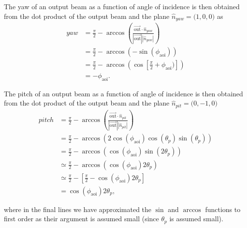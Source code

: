 \documentclass[12pt]{article}
\newcommand{\threeVec}[3]{\big( {#1}, {#2}, {#3} \big)}
\newcommand{\myVec}[1]{\vec{#1}}
\begin{document}
The yaw of an output beam as a function of angle of incidence is then
obtained from the dot product of the output beam and the plane
$\hat{n}_{yaw}=\threeVec{1}{0}{0}$ as
\begin{align}
  yaw &= \frac{\pi}{2} - \arccos\left(\frac{\myVec{\mathrm{out}}\cdot\hat{n}_{yaw}}{|\myVec{\mathrm{out}}||\hat{n}_{yaw}|}\right)\\
  &=\frac{\pi}{2} - \arccos\left( -\sin(\phi_\mathrm{aoi}) \right)\\
  &=\frac{\pi}{2} - \arccos\left( \cos\left[\frac{\pi}{2}+\phi_\mathrm{aoi})\right] \right)\\
&=-\phi_\mathrm{aoi}.
\end{align}

The pitch of an output beam as a function of angle of incidence is
then obtained from the dot product of the output beam and the plane
$\hat{n}_{pit}=\threeVec{0}{-1}{0}$
\begin{align}
  pitch &= \frac{\pi}{2} - \arccos\left(\frac{\myVec{\mathrm{out}}\cdot\hat{n}_{pit}}{|\myVec{\mathrm{out}}||\hat{n}_{pit}|}\right)\\
  &=\frac{\pi}{2} - \arccos\left(2\cos(\phi_\mathrm{aoi})\cos(\theta_p)\sin(\theta_p)\right)\\
&=\frac{\pi}{2} - \arccos\left(\cos(\phi_\mathrm{aoi})\sin(2\theta_p)\right)\\
&\simeq \frac{\pi}{2} - \arccos\left(\cos(\phi_\mathrm{aoi})2\theta_p\right)\\
&\simeq \frac{\pi}{2} - \left[\frac{\pi}{2}-\cos(\phi_\mathrm{aoi})2\theta_p\right]\\
&=\cos(\phi_\mathrm{aoi})2\theta_p,
\end{align}

where in the final lines we have approximated the $\sin$ and $\arccos$
functions to first order as their argument is assumed small (since
$\theta_p$ is assumed small).

\end{document}

